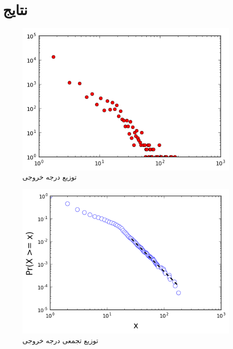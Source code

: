 \documentclass[11pt]{article}
\begin{document}
\section{نتایج}
\begin{figure}[!h]
\caption{توزیع درجه خروجی}
\centering
\includegraphics[height=0.4\textheight]{out-degree-distribution}
\end{figure}
\begin{figure}[!h]
\caption{توزیع تجمعی درجه خروجی}
\centering
\includegraphics[height=0.4\textheight]{out-degree-distribution-exponent}
\end{figure}
\end{document}
